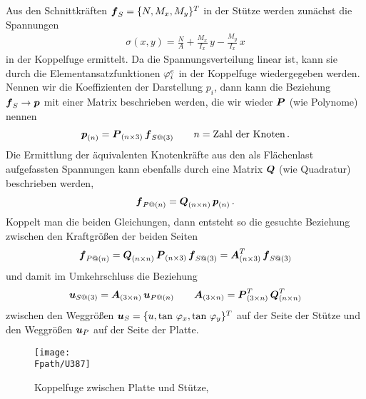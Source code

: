 Aus den Schnittkr\"{a}ften $\mbox{\boldmath $f$}_S = \{N, M_x, M_y\}^T$ in der St\"{u}tze werden zun\"{a}chst die Spannungen
\begin{align}
\sigma(x,y) = \frac{N}{A} + \frac{M_x}{I_x}\,y - \frac{M_y}{I_x}\,x
\end{align}
in der Koppelfuge ermittelt. Da die Spannungsverteilung linear ist, kann sie durch die Elementansatzfunktionen $\varphi_i^e$ in der Koppelfuge wiedergegeben werden.  Nennen wir die Koeffizienten der Darstellung $p_i$, dann kann die Beziehung $\mbox{\boldmath $f$}_S \to \mbox{\boldmath $p$}$ mit einer Matrix beschrieben werden, die wir wieder $\mbox{\boldmath $P$}$ (wie Polynome) nennen
\begin{align}
\mbox{\boldmath $p$}_{(n)} = \mbox{\boldmath $P$}_{(n \times 3)}\,\mbox{\boldmath $f$}_{S@ (3)} \qquad n = \text{Zahl der Knoten}\,.
\end{align}
Die Ermittlung der \"{a}quivalenten Knotenkr\"{a}fte aus den als Fl\"{a}chenlast aufgefassten Spannungen kann ebenfalls durch eine Matrix $\mbox{\boldmath $Q$}$ (wie Quadratur) beschrieben werden,
\begin{align}
\mbox{\boldmath $f$}_{P@ (n)} = \mbox{\boldmath $Q$}_{(n \times n)}\,\mbox{\boldmath $p$}_{(n)}\,.
\end{align}
Koppelt man die beiden Gleichungen, dann entsteht so die gesuchte Beziehung zwischen den Kraftgr\"{o}{\ss}en der beiden Seiten
\begin{align}
\mbox{\boldmath $f$}_{P@ (n)} = \mbox{\boldmath $Q$}_{(n \times n)}\,\mbox{\boldmath $P$}_{(n \times 3)}\,\mbox{\boldmath $f$}_{S@ (3)} = \mbox{\boldmath $A$}^T_{(n \times 3)}\,\mbox{\boldmath $f$}_{S@ (3)}
\end{align}
und damit im Umkehrschluss die Beziehung
\begin{align} \label{Eq99}
\mbox{\boldmath $u$}_{S@ (3)} = \mbox{\boldmath $A$}_{(3 \times n)}\,\mbox{\boldmath $u$}_{P@ (n)} \qquad \mbox{\boldmath $A$}_{(3 \times n)} = \mbox{\boldmath $P$}^T_{(3 \times n)}\,\mbox{\boldmath $Q$}^T_{(n \times n)}
\end{align}
zwischen den Weggr\"{o}{\ss}en $\mbox{\boldmath $u$}_S = \{u, \tan\,\varphi_x,\tan\,\varphi_y\}^T$ auf der Seite der St\"{u}tze und den Weggr\"{o}{\ss}en $\mbox{\boldmath $u$}_P $ auf der Seite der Platte.
\begin{figure}[tbp]
\if {} \sidecaption \fi
\texttt{[image: \\Fpath/U387]}
\caption{Koppelfuge zwischen Platte und St\"{u}tze, \cite{Werkle}} \label{U387}
\end{figure}%

